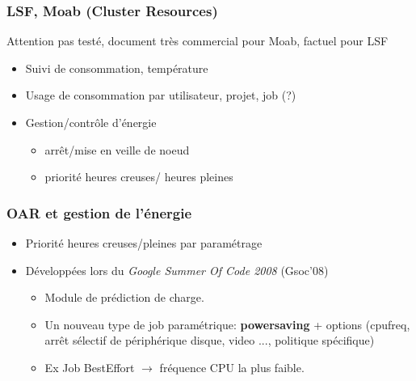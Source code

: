 \documentclass{beamer}
\begin{document}
\begin{frame}
  \frametitle{LSF, Moab (Cluster Resources) }
  Attention pas testé, document très commercial pour Moab, factuel pour LSF
  \begin{itemize}
		\item Suivi de consommation, température
    \item Usage de consommation par utilisateur, projet, job (?)
    \item Gestion/contrôle d'énergie
    \begin{itemize}
      \item arrêt/mise en veille de noeud
      \item priorité heures creuses/ heures pleines
    \end{itemize}
  \end{itemize}
\end{frame}

\begin{frame}
  \frametitle{OAR et gestion de l'énergie}
  \begin{itemize}
    \item Priorité heures creuses/pleines par paramétrage
		\item Développées lors du {\em Google Summer Of Code 2008} (Gsoc'08)
    \begin{itemize}
       \item Module de prédiction de charge.
       \item Un nouveau type de job paramétrique:  {\bf powersaving} + options (cpufreq, arrêt sélectif de périphérique disque, video ..., politique spécifique)
       \item Ex Job BestEffort $\rightarrow$ fréquence CPU la plus faible.
    \end{itemize}
  \end{itemize}
\end{frame}

\end{document}
